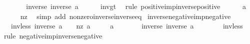 \begin{isabellebody}
\isadelimproof
%
\endisadelimproof
%
\isatagproof
{}\isamarkupfalse%
\ {\isacharminus}{\kern0pt}\isanewline
\ \ \isamarkupfalse%
\ {\isachardoublequoteopen}{}\ {\isacharless}{\kern0pt}\ inverse\ {\isacharparenleft}{\kern0pt}inverse\ a{\isacharparenright}{\kern0pt}{\isachardoublequoteclose}\isanewline
\ \ \ \ \isamarkupfalse%
\ inv{\isacharunderscore}{\kern0pt}gt{\isacharunderscore}{\kern0pt}{}\ \isamarkupfalse%
\ {\isacharparenleft}{\kern0pt}rule\ positive{\isacharunderscore}{\kern0pt}imp{\isacharunderscore}{\kern0pt}inverse{\isacharunderscore}{\kern0pt}positive{\isacharparenright}{\kern0pt}\isanewline
\ \ \isamarkupfalse%
\ {\isachardoublequoteopen}{}\ {\isacharless}{\kern0pt}\ a{\isachardoublequoteclose}\isanewline
\ \ \ \ \isamarkupfalse%
\ nz\ \isamarkupfalse%
\ {\isacharparenleft}{\kern0pt}simp\ add{\isacharcolon}{\kern0pt}\ nonzero{\isacharunderscore}{\kern0pt}inverse{\isacharunderscore}{\kern0pt}inverse{\isacharunderscore}{\kern0pt}eq{\isacharparenright}{\kern0pt}\isanewline
{}\isamarkupfalse%
%
\endisatagproof
{\isafoldproof}%
%
\isadelimproof
\isanewline
%
\endisadelimproof
\isanewline
{}\isamarkupfalse%
\ inverse{\isacharunderscore}{\kern0pt}negative{\isacharunderscore}{\kern0pt}imp{\isacharunderscore}{\kern0pt}negative{\isacharcolon}{\kern0pt}\isanewline
\ \ \ inv{\isacharunderscore}{\kern0pt}less{\isacharunderscore}{\kern0pt}{}{\isacharcolon}{\kern0pt}\ {\isachardoublequoteopen}inverse\ a\ {\isacharless}{\kern0pt}\ {}{\isachardoublequoteclose}\ \ nz{\isacharcolon}{\kern0pt}\ {\isachardoublequoteopen}a\ {\isasymnoteq}\ {}{\isachardoublequoteclose}\isanewline
\ \ \ {\isachardoublequoteopen}a\ {\isacharless}{\kern0pt}\ {}{\isachardoublequoteclose}\isanewline
%
\isadelimproof
%
\endisadelimproof
%
\isatagproof
{}\isamarkupfalse%
\ {\isacharminus}{\kern0pt}\isanewline
\ \ \isamarkupfalse%
\ {\isachardoublequoteopen}inverse\ {\isacharparenleft}{\kern0pt}inverse\ a{\isacharparenright}{\kern0pt}\ {\isacharless}{\kern0pt}\ {}{\isachardoublequoteclose}\isanewline
\ \ \ \ \isamarkupfalse%
\ inv{\isacharunderscore}{\kern0pt}less{\isacharunderscore}{\kern0pt}{}\ \isamarkupfalse%
\ {\isacharparenleft}{\kern0pt}rule\ negative{\isacharunderscore}{\kern0pt}imp{\isacharunderscore}{\kern0pt}inverse{\isacharunderscore}{\kern0pt}negative{\isacharparenright}{\kern0pt}\isanewline

\end{isabellebody}
